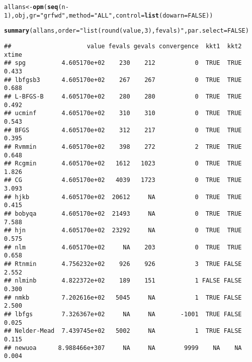 \documentclass[11pt]{article}\usepackage[]{graphicx}\usepackage[]{color}
\makeatletter
\newcommand{\hlnum}[1]{\textcolor[rgb]{0.686,0.059,0.569}{#1}}%
\newcommand{\hlstr}[1]{\textcolor[rgb]{0.192,0.494,0.8}{#1}}%
\newcommand{\hlopt}[1]{\textcolor[rgb]{0,0,0}{#1}}%
\newcommand{\hlstd}[1]{\textcolor[rgb]{0.345,0.345,0.345}{#1}}%
\newcommand{\hlkwb}[1]{\textcolor[rgb]{0.69,0.353,0.396}{#1}}%
\newcommand{\hlkwc}[1]{\textcolor[rgb]{0.333,0.667,0.333}{#1}}%
\newcommand{\hlkwd}[1]{\textcolor[rgb]{0.737,0.353,0.396}{\textbf{#1}}}%
\newenvironment{kframe}{%
 \def\at@end@of@kframe{}%
 \ifinner\ifhmode%
  \def\at@end@of@kframe{\end{minipage}}%
  \begin{minipage}{\columnwidth}%
 \fi\fi%
 \def\FrameCommand##1{\hskip\@totalleftmargin \hskip-\fboxsep
 \colorbox{shadecolor}{##1}\hskip-\fboxsep
     \hskip-\linewidth \hskip-\@totalleftmargin \hskip\columnwidth}%
 \MakeFramed {\advance\hsize-\width
   \@totalleftmargin\z@ \linewidth\hsize
   \@setminipage}}%
 {\par\unskip\endMakeFramed%
 \at@end@of@kframe}
\newenvironment{knitrout}{}{} %
\makeatother
\begin{document}
\begin{knitrout}\scriptsize
{}\color{fgcolor}\begin{kframe}
\begin{alltt}
\hlstd{allans}\hlkwb{<-} \hlkwd{opm}\hlstd{(}\hlkwd{seq}\hlstd{(n}\hlopt{-}\hlnum{1}\hlstd{), obj,} \hlkwc{gr}\hlstd{=}\hlstr{"grfwd"}\hlstd{,} \hlkwc{method}\hlstd{=}\hlstr{"ALL"}\hlstd{,} \hlkwc{control}\hlstd{=}\hlkwd{list}\hlstd{(}\hlkwc{dowarn}\hlstd{=}\hlnum{FALSE}\hlstd{))}
\end{alltt}


{\ttfamily\noindent{}}

{\ttfamily\noindent{}}

{\ttfamily\noindent\color{warningcolor}{\#\# Warning in nmk(par = spar, fn = efn, control = mcontrol, ...): Nelder-Mead should not be used for high-dimensional optimization}}

{\ttfamily\noindent\color{warningcolor}{\#\# Warning in optimr(par, fn, gr, method = meth, lower = lower, upper = upper, : Maximum number of fevals exceeded\ \ Restarts for stagnation =0}}\begin{alltt}
\hlkwd{summary}\hlstd{(allans,} \hlkwc{order} \hlstd{=} \hlstr{"list(round(value, 3), fevals)"}\hlstd{,} \hlkwc{par.select} \hlstd{=} \hlnum{FALSE}\hlstd{)}
\end{alltt}
\begin{verbatim}
##                     value fevals gevals convergence  kkt1  kkt2 xtime
## spg          4.605170e+02    230    212           0  TRUE  TRUE 0.433
## lbfgsb3      4.605170e+02    267    267           0  TRUE  TRUE 0.688
## L-BFGS-B     4.605170e+02    280    280           0  TRUE  TRUE 0.492
## ucminf       4.605170e+02    310    310           0  TRUE  TRUE 0.543
## BFGS         4.605170e+02    312    217           0  TRUE  TRUE 0.395
## Rvmmin       4.605170e+02    398    272           2  TRUE  TRUE 0.648
## Rcgmin       4.605170e+02   1612   1023           0  TRUE  TRUE 1.826
## CG           4.605170e+02   4039   1723           0  TRUE  TRUE 3.093
## hjkb         4.605170e+02  20612     NA           0  TRUE  TRUE 0.415
## bobyqa       4.605170e+02  21493     NA           0  TRUE  TRUE 7.588
## hjn          4.605170e+02  23292     NA           0  TRUE  TRUE 0.575
## nlm          4.605170e+02     NA    203           0  TRUE  TRUE 0.658
## Rtnmin       4.756232e+02    926    926           3  TRUE FALSE 2.552
## nlminb       4.822372e+02    189    151           1 FALSE FALSE 0.300
## nmkb         7.202616e+02   5045     NA           1  TRUE FALSE 2.500
## lbfgs        7.326367e+02     NA     NA       -1001  TRUE FALSE 0.025
## Nelder-Mead  7.439745e+02   5002     NA           1  TRUE FALSE 0.115
## newuoa      8.988466e+307     NA     NA        9999    NA    NA 0.004
\end{verbatim}
\end{kframe}
\end{knitrout}
\end{document}
